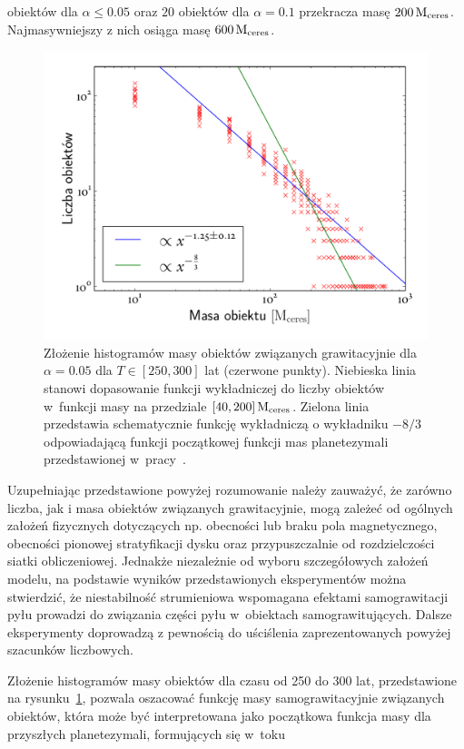 obiektów dla $\alpha \leq 0.05$ oraz $20$ obiektów dla $\alpha = 0.1$ przekracza
masę $200\hbox{$\mathrm{\thinspace M_{\textrm{ceres}}}$}$.  Najmasywniejszy z nich osiąga masę $600\hbox{$\mathrm{\thinspace M_{\textrm{ceres}}}$}$.
%
\begin{figure}[ht]
   \centering
   \includegraphics[width=0.7\linewidth]{figures/mass_func}
   \caption[Złożenie histogramów masy obiektów związanych grawitacyjnie dla
   $\alpha = 0.05$.]
   {Złożenie histogramów masy obiektów związanych grawitacyjnie dla
   $\alpha = 0.05$ dla $T \in [250, 300]$ lat (czerwone punkty). Niebieska linia
stanowi dopasowanie funkcji wykładniczej do liczby obiektów w~funkcji masy na
przedziale $[40,200]\hbox{$\mathrm{\thinspace M_{\textrm{ceres}}}$}$. Zielona linia przedstawia schematycznie funkcję
wykładniczą o wykładniku $-8/3$ odpowiadającą funkcji początkowej funkcji mas
planetezymali przedstawionej w~pracy~\cite{MFFK98}.}
   \label{fig:massfun}
\end{figure}
\par Uzupełniając przedstawione powyżej rozumowanie należy zauważyć, że zarówno
liczba,
jak i masa obiektów związanych grawitacyjnie, mogą zależeć od ogólnych założeń
fizycznych dotyczących np. obecności lub braku pola magnetycznego, obecności
pionowej stratyfikacji dysku oraz przypuszczalnie od rozdzielczości siatki
obliczeniowej. Jednakże niezależnie od wyboru szczegółowych założeń
modelu, na podstawie wyników przedstawionych eksperymentów mo\-żna stwierdzić, że
niestabilność strumieniowa wspomagana efektami samograwitacji pyłu prowadzi do
związania części pyłu w~obiektach samograwitujących. Dalsze eksperymenty
doprowadzą z pewnością do uściślenia zaprezentowanych powyżej szacunków
liczbowych.
%
\par Złożenie histogramów masy obiektów dla czasu od 250 do 300 lat,
przedstawione na rysunku~\ref{fig:massfun}, pozwala oszacować funkcję masy
samograwitacyjnie związanych obiektów, która może być interpretowana jako
początkowa funkcja masy dla przyszłych planetezymali, formujących się w~toku
